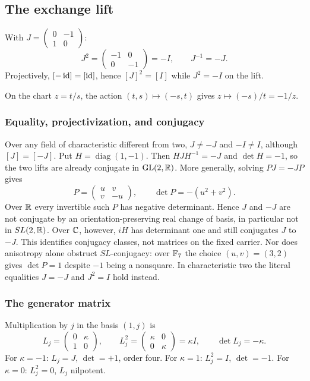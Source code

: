 \subsection{The exchange lift}

With $J=\begin{pmatrix}0&-1\\ 1&0\end{pmatrix}$:
\[
  J^{2}=\begin{pmatrix}-1&0\\ 0&-1\end{pmatrix}=-I,\qquad
  J^{-1}=-J .
\]
Projectively, $[-\operatorname{id}]=[\operatorname{id}]$, hence $[J]^{2}=[I]$ while $J^{2}=-I$ on the lift.

On the chart $z=t/s$, the action $(t,s)\mapsto(-s,t)$ gives
$z\mapsto(-s)/t=-1/z$.

\subsubsection{Equality, projectivization, and conjugacy}
Over any field of characteristic different from two, $J\neq-J$ and $-I\neq I$,
although $[J]=[-J]$.  Put $H=\operatorname{diag}(1,-1)$.  Then
$HJH^{-1}=-J$ and $\det H=-1$, so the two lifts are already conjugate in
$\operatorname{GL}(2,\mathbb{R})$.  More generally, solving $PJ=-JP$ gives
\[
  P=\begin{pmatrix}u&v\\ v&-u\end{pmatrix},\qquad
  \det P=-(u^{2}+v^{2}).
\]
Over $\mathbb{R}$ every invertible such $P$ has negative determinant.  Hence $J$ and $-J$
are not conjugate by an orientation-preserving real change of basis, in particular
not in $SL(2,\mathbb{R})$.  Over $\mathbb{C}$, however, $iH$ has determinant one and still
conjugates $J$ to $-J$.  This identifies conjugacy classes, not matrices on the fixed
carrier.  Nor does anisotropy alone obstruct $SL$-conjugacy: over $\mathbb{F}_7$ the choice
$(u,v)=(3,2)$ gives $\det P=1$ despite $-1$ being a nonsquare.  In characteristic
two the literal equalities $J=-J$ and $J^{2}=I$ hold instead.

\subsubsection{The generator matrix}
Multiplication by $j$ in the basis $(1,j)$ is
\[
  L_j=\begin{pmatrix}0&\kappa\\ 1&0\end{pmatrix},\qquad
  L_j^{2}=\begin{pmatrix}\kappa&0\\ 0&\kappa\end{pmatrix}=\kappa I,\qquad
  \det L_j=-\kappa .
\]
For $\kappa=-1$: $L_j=J$, $\det=+1$, order four.  For $\kappa=1$: $L_j^{2}=I$,
$\det=-1$.  For $\kappa=0$: $L_j^{2}=0$, $L_j$ nilpotent.


